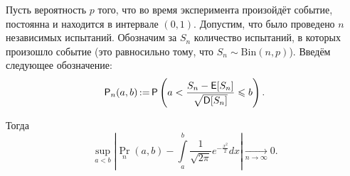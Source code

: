 \begin{itemize}
        \begin{theorem}
           Пусть вероятность \(p\) того, что во время эксперимента произойдёт событие, постоянна и находится в интервале \((0, 1)\). Допустим, что было проведено \(n\) независимых испытаний. Обозначим за \(S_n\) количество испытаний, в которых произошло событие (это равносильно тому, что \(S_n \sim \mathrm{Bin}(n, p)\)). Введём следующее обозначение:
           \[\Pr_n(a,b)\mathop{:=} \Pr\left( a < \frac{S_n - \E[S_n]}{\sqrt{\D[S_n]}} \leq b \right).\]
           
           Тогда
           \[
           \sup_{a<b} \left|\Pr_n(a, b) - \int\limits_a^b\frac{1}{\sqrt{2\pi}}e^{-\frac{x^{2}}{2}}dx\right| \xrightarrow[n\to\infty]{} 0.
           \]
        \end{theorem}

\end{itemize}
